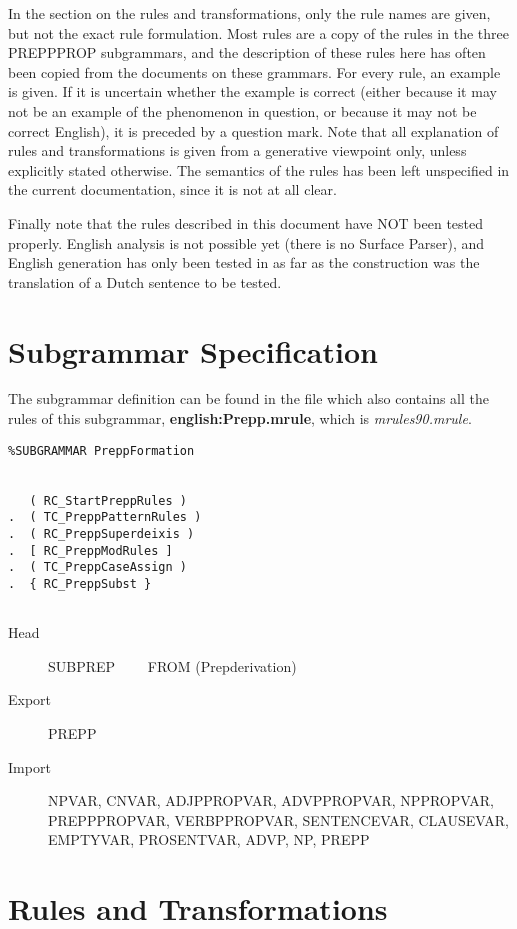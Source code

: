 In the section on the rules and transformations, only the rule names are given, 
but not the exact rule formulation. Most rules are a copy of the rules in the 
three PREPPPROP subgrammars, and the description of these rules here has 
often been copied from the documents on these grammars. 
For every rule, an example is given. If 
it is uncertain whether the example is correct (either 
because it may not be an example of the phenomenon in question, or because it 
may not be correct English), it is preceded by a question mark. Note that all 
explanation of rules and transformations is given from a generative viewpoint
only, unless explicitly stated otherwise. The semantics of the rules 
has been left unspecified in the current documentation, since it is not at all 
clear.


Finally note that the rules described in this document have NOT been tested 
properly. English analysis is not possible yet (there is no Surface Parser), and 
English generation has only been tested in as far as the construction was the 
translation of a Dutch sentence to be tested.

\newpage
\section{Subgrammar Specification}
The subgrammar definition can be found in the file which also contains all the 
rules of this subgrammar, {\bf english:Prepp.mrule}, 
which is {\em mrules90.mrule\/}.

\begin{verbatim}
%SUBGRAMMAR PreppFormation


   ( RC_StartPreppRules )
.  ( TC_PreppPatternRules )
.  ( RC_PreppSuperdeixis )
.  [ RC_PreppModRules ]
.  ( TC_PreppCaseAssign )
.  { RC_PreppSubst }


\end{verbatim}

\begin{description}
  \item[Head]  SUBPREP  \ \ \ \ FROM (Prepderivation)
  \item[Export] PREPP
  \item[Import] NPVAR, CNVAR, ADJPPROPVAR, ADVPPROPVAR, NPPROPVAR, 
PREPPPROPVAR, VERBPPROPVAR, SENTENCEVAR, CLAUSEVAR, EMPTYVAR, PROSENTVAR, 
ADVP, NP, PREPP
\end{description}

\newpage
\section{Rules and Transformations}


